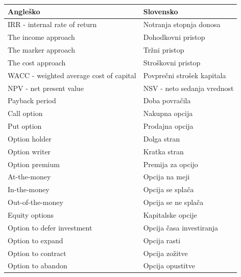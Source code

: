 \begin{table}[ht]
\centering
\setlength\extrarowheight{8pt}
\begin{tabular}{|l|l|}
\hline
\textbf{Angleško} & \textbf{Slovensko} \\
\hline
\hline
  IRR - internal rate of return      &  Notranja stopnja donosa         \\
\hline
    The income approach     &     Dohodkovni pristop      \\
\hline
    The marker approach     &    Tržni pristop      \\
\hline
      The cost approach   &     Stroškovni pristop      \\
\hline
      WACC -  weighted average cost of capital  &   Povprečni strošek kapitala        \\
\hline
  NPV - net present value  &        NSV - neto sedanja vrednost   \\
\hline
     Payback period    &      Doba povračila     \\
\hline
    Call option     &       Nakupna opcija    \\
\hline
    Put option     &      Prodajna opcija     \\
\hline
     Option holder    &       Dolga stran    \\
\hline
     Option writer    &       Kratka stran \\   
\hline
	Option premium & Premija za opcijo \\
\hline
	At-the-money & Opcija na meji \\
\hline
	In-the-money & Opcija se splača \\
\hline
	Out-of-the-money & Opcija se ne splača\\
\hline
	Equity options & Kapitalske opcije \\
\hline
	Option to defer investment & Opcija časa investiranja \\
\hline
	Option to expand & Opcija rasti \\
\hline
	Option to contract & Opcija zožitve \\
\hline
	Option to abandon & Opcija opustitve \\
\hline	
\end{tabular}
\end{table}


